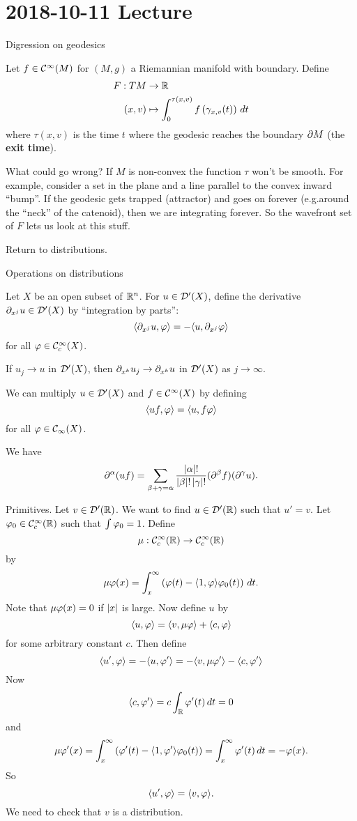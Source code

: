 \section{2018-10-11 Lecture}

Digression on geodesics

Let $f\in\mathcal{C}^\infty(M)$ for $(M,g)$ a Riemannian manifold with boundary.
Define
\begin{align*}
  F: TM &\to \mathbb{R} \\
  (x,v) &\mapsto \int_0^{\tau(x,v)} f\left( \gamma_{x,v}(t) \right) \, dt
\end{align*}
where $\tau(x,v)$ is the time $t$ where the geodesic reaches the boundary $\partial M$ (the \textbf{exit time}).

What could go wrong?
If $M$ is non-convex the function $\tau$ won't be smooth.
For example, consider a set in the plane and a line parallel to the convex inward ``bump''.
If the geodesic gets trapped (attractor) and goes on forever (e.g.\@ around the ``neck'' of the catenoid), then we are integrating forever.
So the wavefront set of $F$ lets us look at this stuff.

Return to distributions.

Operations on distributions

Let $X$ be an open subset of $\mathbb{R}^n$.
For $u\in\mathcal{D}'(X)$, define the derivative $\partial_{x^j}u\in\mathcal{D}'(X)$ by ``integration by parts'':
\[ {\left\langle \partial_{x^j}u,\varphi \right\rangle} = -{\left\langle u,\partial_{x^j}\varphi \right\rangle} \]
for all $\varphi\in\mathcal{C}_c^\infty(X)$.

\begin{thm}[Exercise]
  If $u_j\to u$ in $\mathcal{D}'(X)$, then $\partial_{x^k}u_j \to \partial_{x^k}u$ in $\mathcal{D}'(X)$ as $j\to\infty$.
\end{thm}

We can multiply $u\in\mathcal{D}'(X)$ and $f\in\mathcal{C}^\infty(X)$ by defining
\[ {\left\langle uf,\varphi \right\rangle} = {\left\langle u,f\varphi \right\rangle} \]
for all $\varphi\in\mathcal{C}_\infty(X)$.

\begin{thm}
  We have
  \[ \partial^\alpha(uf) = \sum_{\beta+\gamma=\alpha}\frac{\left\lvert \alpha \right\rvert!}{\left\lvert \beta \right\rvert!\left\lvert \gamma \right\rvert!} (\partial^\beta f) (\partial^\gamma u). \]
\end{thm}

Primitives.
Let $v\in\mathcal{D}'(\mathbb{R})$.
We want to find $u\in\mathcal{D}'(\mathbb{R})$ such that $u'=v$.
Let $\varphi_0\in\mathcal{C}_c^\infty(\mathbb{R})$ such that $\int\varphi_0=1$.
Define
\[ \mu: \mathcal{C}_c^\infty(\mathbb{R}) \to \mathcal{C}_c^\infty(\mathbb{R}) \]
by
\[ \mu\varphi(x) = \int_x^\infty \left( \varphi(t)-{\left\langle 1,\varphi \right\rangle}\varphi_0(t) \right) \, dt. \]
Note that $\mu\varphi(x)=0$ if $\left\lvert x \right\rvert$ is large.
Now define $u$ by
\begin{equation}
  {\left\langle u,\varphi\right\rangle} = {\left\langle v,\mu\varphi \right\rangle} + {\left\langle c,\varphi \right\rangle}
  \label{19:star}
\end{equation}
for some arbitrary constant $c$.
Then define
\[ {\left\langle u',\varphi \right\rangle} = -{\left\langle u,\varphi' \right\rangle} = -{\left\langle v,\mu\varphi' \right\rangle} - {\left\langle c,\varphi' \right\rangle} \]
Now
\[ {\left\langle c,\varphi' \right\rangle} = c\int_{\mathbb{R}}\varphi'(t) \, dt = 0 \]
and
\[ \mu\varphi'(x) = \int_x^\infty \left( \varphi'(t)-{\left\langle 1,\varphi' \right\rangle}\varphi_0(t) \right) = \int_x^\infty \varphi'(t) \, dt = -\varphi(x). \]
So
\[ {\left\langle u',\varphi \right\rangle}={\left\langle v,\varphi \right\rangle}. \]
We need to check that $v$ is a distribution.

